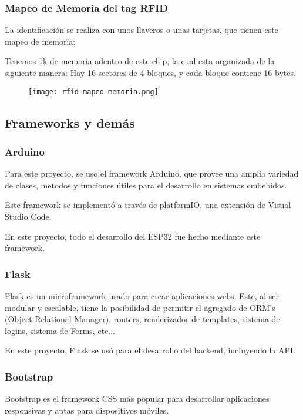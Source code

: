 \documentclass[../informe_krapp.tex]{subfiles}
\begin{document}
\clearpage
\subsubsection{Mapeo de Memoria del tag RFID}
La identificación se realiza con unos llaveros o unas tarjetas,
que tienen este mapeo de memoria:

Tenemos 1k de memoria adentro de este chip, la cual esta organizada de la
siguiente manera: Hay 16 sectores de 4 bloques, y cada bloque contiene 16 bytes.

\begin{figure}[H]
	\centering
	\texttt{[image: rfid-mapeo-memoria.png]}
\end{figure}

\subsection{Frameworks y demás}
\subsubsection{Arduino}
Para este proyecto, se uso el framework Arduino, que provee una amplia variedad de
clases, metodos y funciones útiles para el desarrollo en sistemas embebidos.

Este framework se implementó a través de platformIO, una extensión de Visual Studio Code.

En este proyecto, todo el desarrollo del ESP32 fue hecho mediante este framework.

\subsubsection{Flask}
Flask es un microframework usado para crear aplicaciones webs. Este, al ser modular y escalable, tiene la posibilidad
de permitir el agregado de ORM's (Object Relational Manager), routers, renderizador de templates, sistema de logins,
sistema de Forms, etc...

En este proyecto, Flask se usó para el desarrollo del backend, incluyendo la API.

\subsubsection{Bootstrap}

Bootstrap es el framework CSS más popular para desarrollar aplicaciones responsivas y aptas para dispositivos móviles.
\end{document}
